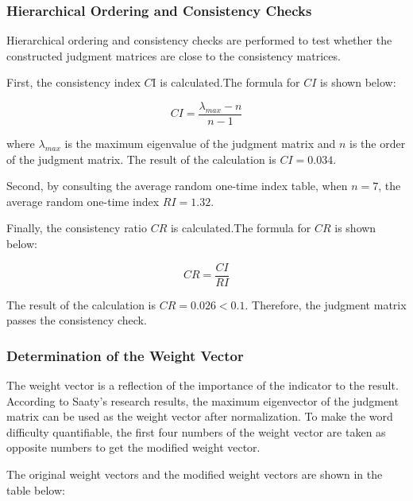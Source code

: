 \documentclass[12pt]{article}  %
\begin{document}
\subsubsection*{Hierarchical Ordering and Consistency Checks}
Hierarchical ordering and consistency checks are performed to test whether the constructed judgment matrices are close to the consistency matrices.

First, the consistency index $C$I is calculated.The formula for $CI$ is shown below:

\begin{equation}
	CI = \frac{\lambda_{max}-n}{n-1}
\end{equation}

where $\lambda_{max}$ is the maximum eigenvalue of the judgment matrix and $n$ is the order of the judgment matrix. The result of the calculation is $CI=0.034$.

Second, by consulting the average random one-time index table, when $n=7$, the average random one-time index $RI=1.32$.

Finally, the consistency ratio $CR$ is calculated.The formula for $CR$ is shown below:

\begin{equation}
	CR = \frac{CI}{RI}
\end{equation}

The result of the calculation is $CR=0.026<0.1$. Therefore, the judgment matrix passes the consistency check.

\subsubsection{Determination of the Weight Vector}
The weight vector is a reflection of the importance of the indicator to the result. According to Saaty's research results, the maximum eigenvector of the judgment matrix can be used as the weight vector after normalization. To make the word difficulty quantifiable, the first four numbers of the weight vector are taken as opposite numbers to get the modified weight vector.

The original weight vectors and the modified weight vectors are shown in the table below:

\begin{table}[H]
	\centering
	\caption{Weight vectors before and after modification}
\end{table}
\vspace{-0.5cm}
\end{document}
